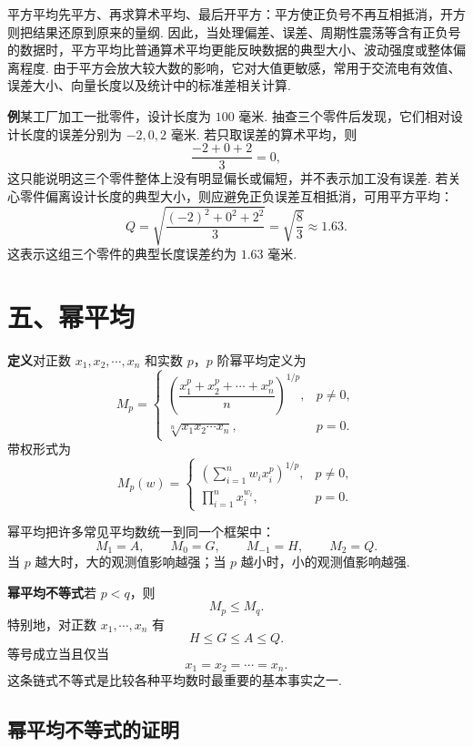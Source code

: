 \documentclass[UTF8,12pt,a4paper,fontset=fandol]{ctexart}
\begin{document}
平方平均先平方、再求算术平均、最后开平方：平方使正负号不再互相抵消，开方则把结果还原到原来的量纲. 因此，当处理偏差、误差、周期性震荡等含有正负号的数据时，平方平均比普通算术平均更能反映数据的典型大小、波动强度或整体偏离程度. 由于平方会放大较大数的影响，它对大值更敏感，常用于交流电有效值、误差大小、向量长度以及统计中的标准差相关计算.

\noindent\textbf{例}\quad 某工厂加工一批零件，设计长度为 $100$ 毫米. 抽查三个零件后发现，它们相对设计长度的误差分别为 $-2,0,2$ 毫米. 若只取误差的算术平均，则
\[
  \frac{-2+0+2}{3}=0,
\]
这只能说明这三个零件整体上没有明显偏长或偏短，并不表示加工没有误差. 若关心零件偏离设计长度的典型大小，则应避免正负误差互相抵消，可用平方平均：
\[
  Q=\sqrt{\frac{(-2)^2+0^2+2^2}{3}}=\sqrt{\frac{8}{3}}\approx1.63.
\]
这表示这组三个零件的典型长度误差约为 $1.63$ 毫米.

\section*{五、幂平均}

\noindent\textbf{定义}\quad 对正数 $x_1,x_2,\cdots,x_n$ 和实数 $p$，$p$ 阶幂平均定义为
\[
  M_p=
  \begin{cases}
    \left(\dfrac{x_1^p+x_2^p+\cdots+x_n^p}{n}\right)^{1/p}, & p\ne0,\\[1.2em]
    \sqrt[n]{x_1x_2\cdots x_n}, & p=0.
  \end{cases}
\]
带权形式为
\[
  M_p(w)=
  \begin{cases}
    \left(\displaystyle\sum_{i=1}^n w_i x_i^p\right)^{1/p}, & p\ne0,\\[1.2em]
    \displaystyle\prod_{i=1}^n x_i^{w_i}, & p=0.
  \end{cases}
\]

幂平均把许多常见平均数统一到同一个框架中：
\[
  M_1=A,\qquad M_0=G,\qquad M_{-1}=H,\qquad M_2=Q.
\]
当 $p$ 越大时，大的观测值影响越强；当 $p$ 越小时，小的观测值影响越强.

\noindent\textbf{幂平均不等式}\quad 若 $p<q$，则
\[
  M_p\le M_q.
\]
特别地，对正数 $x_1,\cdots,x_n$ 有
\[
  H\le G\le A\le Q.
\]
等号成立当且仅当
\[
  x_1=x_2=\cdots=x_n.
\]
这条链式不等式是比较各种平均数时最重要的基本事实之一.

\subsection*{幂平均不等式的证明}

\begingroup
\color{rnorange}
\end{document}

